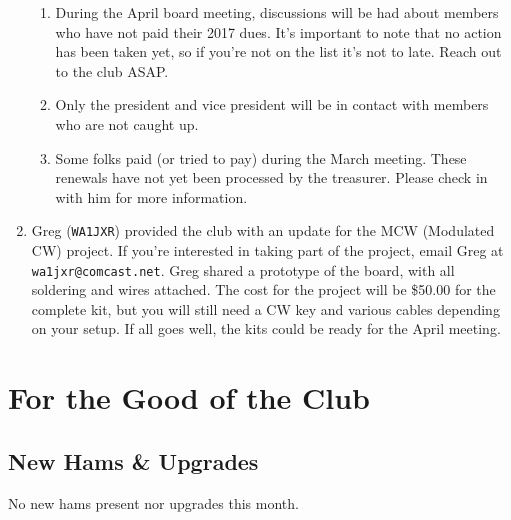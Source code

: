 \documentclass[10pt,letterpaper]{article}
\begin{document}
\begin{enumerate}
\begin{enumerate}
  \item During the April board meeting, discussions will be had about members who have not paid their 2017 dues. It's important to note that no action has been taken yet, so if you're not on the list it's not to late. Reach out to the club ASAP.

  \item Only the president and vice president will be in contact with members who are not caught up.

  \item Some folks paid (or tried to pay) during the March meeting. These renewals have not yet been processed by the treasurer. Please check in with him for more information.

\end{enumerate}
  \newpage
  \item Greg (\texttt{WA1JXR}) provided the club with an update for the MCW (Modulated CW) project. If you're interested in taking part of the project, email Greg at \texttt{wa1jxr@comcast.net}. Greg shared a prototype of the board, with all soldering and wires attached. The cost for the project will be \$50.00 for the complete kit, but you will still need a CW key and various cables depending on your setup. If all goes well, the kits could be ready for the April meeting.
\end{enumerate}

\section{For the Good of the Club}

\subsection{New Hams \& Upgrades}

No new hams present nor upgrades this month.
\end{document}
